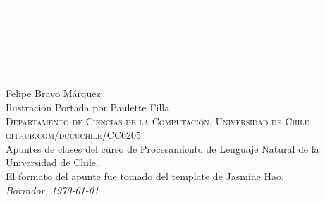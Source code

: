 \documentclass[11pt,fleqn]{book} %
\begin{document}

\begingroup
\thispagestyle{empty}
\centering
\vspace*{5cm}
\par\normalfont\fontsize{35}{35}\sffamily\selectfont
\textbf{\textcolor{white}{Procesamiento de Lenguaje Natural}}\\
{\LARGE \textcolor{white}{Apunte de Clases (Borrador)}}\par %
\vspace*{1cm}
{\Huge \textcolor{white}{Felipe Bravo Márquez}}\par %
\endgroup


\newpage
~\vfill
\thispagestyle{empty}

\noindent Felipe Bravo Márquez\\

\noindent Ilustración Portada por Paulette Filla\\

\noindent \textsc{Departamento de Ciencias de la Computación, Universidad de Chile}\\

\noindent \textsc{github.com/dccuchile/CC6205}\\ %

\noindent Apuntes de clases del curso de Procesamiento de Lenguaje Natural de la Universidad de Chile.\\ %

\noindent El formato del apunte fue tomado del template de Jasmine Hao. \\

\noindent \textit{Borrador, \today} %


\end{document}
